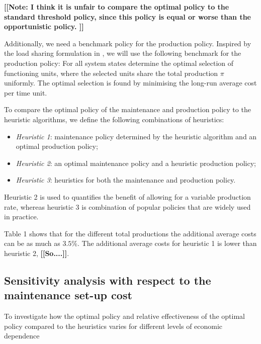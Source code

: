 \documentclass[a4paper,12pt]{article}
\begin{document}
\textbf{[[Note: I think it is unfair to compare the optimal policy to the standard threshold policy, since this policy is equal or worse than the opportunistic policy. ]]}

Additionally, we need a benchmark policy for the production policy. Inspired by the load sharing formulation in \cite{OLDEKEIZER2018319}, we will use the following benchmark for the production policy: For all system states determine the optimal selection of functioning units, where the selected units share the total production $\pi$ uniformly. The optimal selection is found by minimising the long-run average  cost per time unit.

To compare the optimal policy of the maintenance and production policy to the heuristic algorithms, we define the following combinations of heuristics:
\begin{itemize}
	\item \textit{Heuristic 1}: maintenance policy determined by the heuristic algorithm and an optimal production policy;
	\item \textit{Heuristic 2}: an optimal maintenance policy and a heuristic production policy;
	\item \textit{Heuristic 3}: heuristics for both the maintenance and production policy.
\end{itemize}
Heuristic 2 is used to quantifies the benefit of allowing for a variable production rate, whereas heuristic 3 is combination of popular policies that are widely used in practice. 

Table 1 shows that for the different total productions the additional average costs can be as much as $3.5$\%. The additional average costs for heuristic 1 is lower than heuristic 2, \textbf{[[So....]]}. 


\subsection{Sensitivity analysis with respect to the maintenance set-up cost}
To investigate how the optimal policy and relative effectiveness of the optimal policy compared to the heuristics varies for different levels of economic dependence
\end{document}
